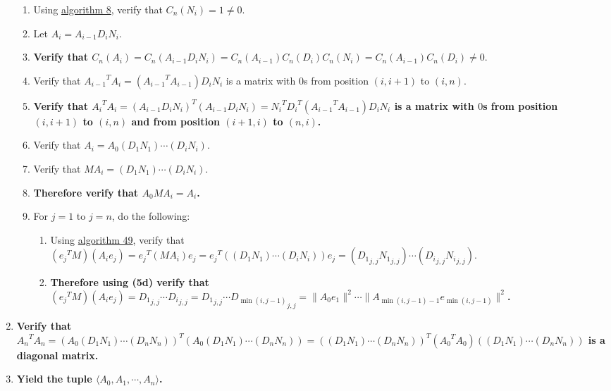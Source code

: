 \documentclass[twocolumn]{article}
\begin{document}
\begin{enumerate}
\begin{enumerate}
					\item Using \hyperref[sec:algorithm 8]{algorithm 8}, verify that $C_n(N_i)=1\ne 0$.
					\item Let $A_i=A_{i-1}D_iN_i$.
					\item \textbf{Verify that $C_n(A_i)=C_n(A_{i-1}D_iN_i)=C_n(A_{i-1})C_n(D_i)C_n(N_i)=C_n(A_{i-1})C_n(D_i)\ne 0$}.
					\item Verify that ${A_{i-1}}^TA_i=({A_{i-1}}^TA_{i-1})D_iN_i$ is a matrix with $0$s from position $(i,i+1)$ to $(i,n)$.
					\item \textbf{Verify that ${A_i}^TA_i=(A_{i-1}D_iN_i)^T(A_{i-1}D_iN_i)={N_i}^T{D_i}^T({A_{i-1}}^TA_{i-1})D_iN_i$ is a matrix with $0$s from position $(i,i+1)$ to $(i,n)$ and from position $(i+1,i)$ to $(n,i)$.}
					\item Verify that $A_i=A_0(D_1N_1)\cdots (D_iN_i)$.
					\item Verify that $MA_i=(D_1N_1)\cdots (D_iN_i)$.
					\item \textbf{Therefore verify that $A_0MA_i=A_i$.}
					\item For $j=1$ to $j=n$, do the following:
					\begin{enumerate}
						\item Using \hyperref[sec:algorithm 49]{algorithm 49}, verify that $({e_j}^TM)(A_ie_j)={e_j}^T(MA_i)e_j={e_j}^T((D_1N_1)\cdots (D_iN_i))e_j=({D_1}_{j,j}{N_1}_{j,j})\cdots ({D_i}_{j,j}{N_i}_{j,j})$.
						\item \textbf{Therefore using (5d) verify that $({e_j}^TM)(A_ie_j)={D_1}_{j,j}\cdots {D_i}_{j,j}={D_1}_{j,j}\cdots {D_{\min(i,j-1)}}_{j,j}=\lVert A_0e_1\rVert^2\cdots\lVert A_{\min(i,j-1)-1}e_{\min(i,j-1)}\rVert^2$.}
					\end{enumerate}
				\end{enumerate}
				\item \textbf{Verify that ${A_n}^TA_n=(A_0(D_1N_1)\cdots (D_nN_n))^T(A_0(D_1N_1)\cdots (D_nN_n))=((D_1N_1)\cdots (D_nN_n))^T({A_0}^TA_0)((D_1N_1)\cdots (D_nN_n))$ is a diagonal matrix.}
				\item \textbf{Yield the tuple $\langle A_0,A_1,\cdots,A_n\rangle$.}
			\end{enumerate}
\end{document}

